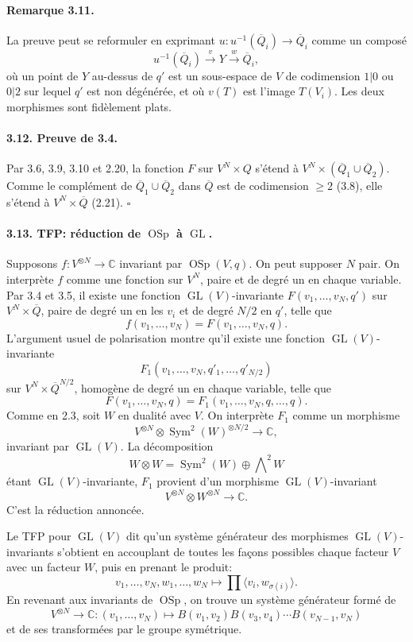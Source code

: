 \documentclass[11pt]{article}
\newcommand{\C}{\mathbb C}
\newcommand{\GL}{\operatorname{GL}}
\newcommand{\OSp}{\operatorname{OSp}}
\newcommand{\Sym}{\operatorname{Sym}}
\newcommand{\barQ}{\overline Q}
\begin{document}
\paragraph{Remarque 3.11.}
La preuve peut se reformuler en exprimant $u:u^{-1}(\barQ_i)\to\barQ_i$ comme un composé
\[
u^{-1}(\barQ_i)\xrightarrow{v}Y\xrightarrow{w}\barQ_i,
\]
où un point de $Y$ au-dessus de $q'$ est un sous-espace de $V$ de codimension $1|0$ ou $0|2$ sur lequel $q'$ est non dégénérée, et où $v(T)$ est l'image $T(V_i)$. Les deux morphismes sont fidèlement plats.

\paragraph{3.12. Preuve de 3.4.}
Par 3.6, 3.9, 3.10 et 2.20, la fonction $F$ sur $V^N\times Q$ s'étend à $V^N\times(\barQ_1\cup\barQ_2)$. Comme le complément de $\barQ_1\cup\barQ_2$ dans $\barQ$ est de codimension $\ge2$ (3.8), elle s'étend à $V^N\times\barQ$ (2.21). \hfill $\square$

\paragraph{3.13. TFP: réduction de $\OSp$ à $\GL$.}
Supposons $f:V^{\otimes N}\to\C$ invariant par $\OSp(V,q)$. On peut supposer $N$ pair. On interprète $f$ comme une fonction sur $V^N$, paire et de degré un en chaque variable. Par 3.4 et 3.5, il existe une fonction $\GL(V)$-invariante $F(v_1,\ldots,v_N,q')$ sur $V^N\times\barQ$, paire de degré un en les $v_i$ et de degré $N/2$ en $q'$, telle que
\[
f(v_1,\ldots,v_N)=F(v_1,\ldots,v_N,q).
\]
L'argument usuel de polarisation montre qu'il existe une fonction $\GL(V)$-invariante
\[
F_1(v_1,\ldots,v_N,q'_1,\ldots,q'_{N/2})
\]
sur $V^N\times\barQ^{N/2}$, homogène de degré un en chaque variable, telle que
\[
F(v_1,\ldots,v_N,q)=F_1(v_1,\ldots,v_N,q,\ldots,q).
\]
Comme en 2.3, soit $W$ en dualité avec $V$. On interprète $F_1$ comme un morphisme
\[
V^{\otimes N}\otimes \Sym^2(W)^{\otimes N/2}\longrightarrow \C,
\]
invariant par $\GL(V)$. La décomposition
\[
W\otimes W=\Sym^2(W)\oplus\bigwedge\nolimits^2W
\]
étant $\GL(V)$-invariante, $F_1$ provient d'un morphisme $\GL(V)$-invariant
\[
V^{\otimes N}\otimes W^{\otimes N}\longrightarrow \C.
\]
C'est la réduction annoncée.

Le TFP pour $\GL(V)$ dit qu'un système générateur des morphismes $\GL(V)$-invariants s'obtient en accouplant de toutes les façons possibles chaque facteur $V$ avec un facteur $W$, puis en prenant le produit:
\[
v_1,\ldots,v_N,w_1,\ldots,w_N\longmapsto\prod \langle v_i,w_{\sigma(i)}\rangle.
\]
En revenant aux invariants de $\OSp$, on trouve un système générateur formé de
\[
V^{\otimes N}\to\C:
(v_1,\ldots,v_N)\longmapsto B(v_1,v_2)B(v_3,v_4)\cdots B(v_{N-1},v_N)
\]
et de ses transformées par le groupe symétrique.
\end{document}
